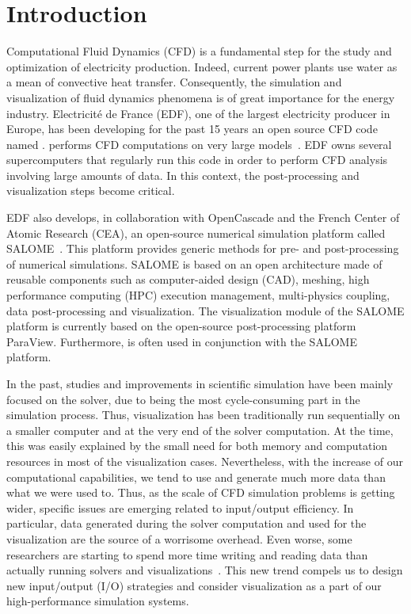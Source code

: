 \section{Introduction}
Computational Fluid Dynamics (CFD) is a fundamental step for the study and
optimization of electricity production. Indeed, current power plants use water
as a mean of convective heat transfer. Consequently, the simulation and
visualization of fluid dynamics phenomena is of great importance for the energy
industry. Electricité de France (EDF), one of the largest electricity producer in Europe, has
been developing for the past 15 years an open source CFD code named \CS. \CS performs
CFD computations on very large models~\cite{5644955}. EDF owns
several supercomputers that regularly run this code in order to perform CFD
analysis involving large amounts of data. In this context, the post-processing
and visualization steps become critical. 

EDF also develops, in collaboration with OpenCascade and the French Center of
Atomic Research (CEA), an open-source numerical simulation platform called
SALOME~\cite{4291178}. This platform provides generic methods for pre- and post-processing of
numerical simulations. SALOME is based on an open architecture made of reusable
components such as computer-aided design (CAD),
meshing, high performance computing (HPC) execution management, multi-physics coupling, data post-processing
and visualization. The visualization module of the SALOME platform is currently based
on the open-source post-processing platform ParaView. Furthermore, \CS is often used 
in conjunction with the SALOME platform.

In the past, studies and improvements in scientific simulation have been mainly
focused on the solver, due to being the most cycle-consuming part in the
simulation process. Thus, visualization has been traditionally run sequentially
on a smaller computer and at the very end of the solver computation. At the
time, this was easily explained by the small need for both memory and
computation resources in most of the visualization cases. Nevertheless, with the
increase of our computational capabilities, we tend to use and generate much
more data than what we were used to. Thus, as the scale of CFD simulation
problems is getting wider, specific issues are emerging related to input/output
efficiency. In particular, data generated during the solver computation and
used for the visualization are the source of a worrisome overhead. Even worse,
some researchers are starting to spend more time writing and reading data
than actually running solvers and visualizations~\cite{1742-6596-125-1-012099}.
This new trend compels us to design new input/output (I/O) strategies and consider
visualization as a part of our high-performance simulation systems.

